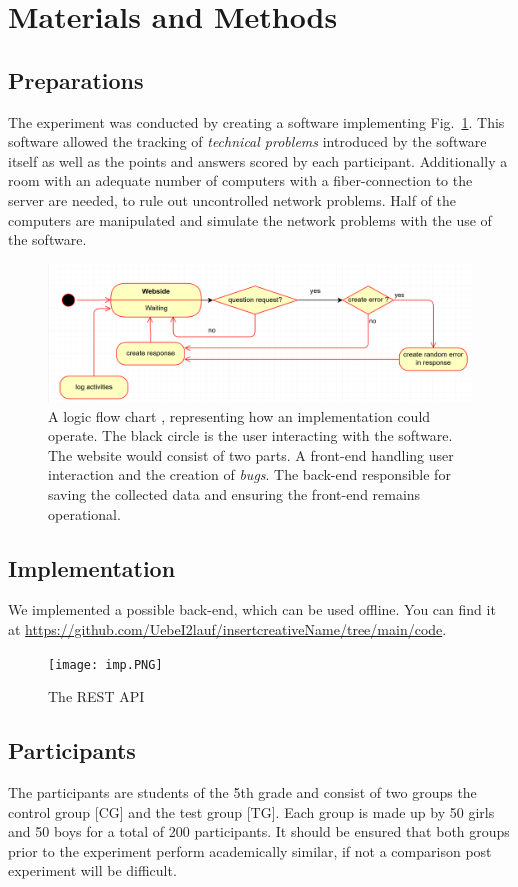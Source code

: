 \documentclass[12pt, a4paper]{article}
\begin{document}
\section{Materials and Methods}
\subsection*{Preparations}
The experiment was conducted by creating a software implementing Fig.~\ref{fig1}.
This software allowed the tracking of {\itshape technical problems} introduced by
the software itself as well as the points and answers scored by each participant.
Additionally a room with an adequate number of computers with a fiber-connection
to the server are needed, to rule out uncontrolled network problems.
Half of the computers are manipulated and simulate the network problems with the
use of the software.

\begin{figure}[h]
    \includegraphics[width=\textwidth]{UML Prototyp.PNG}
    \caption{A logic flow chart , representing how an implementation could operate.
    The black circle is the user interacting with the software. The website would
    consist of two parts. A front-end handling user interaction and the creation of {\itshape bugs}.
    The back-end responsible for saving the collected data and ensuring the front-end
    remains operational.} \label{fig1}
\end{figure}
\newpage
\subsection*{Implementation}
We implemented a possible back-end, which can be used offline. You can find it 
at \url{https://github.com/UebeI2lauf/insertcreativeName/tree/main/code}.
\begin{figure}[h]
    \texttt{[image: imp.PNG]}
    \caption{The REST API}
\end{figure}
\subsection*{Participants}
The participants are students of the 5th grade and consist of two groups the control group [CG] and
the test group [TG]. Each group is made up by 50 girls and 50 boys for a total of 200 participants.
It should be ensured that both groups prior to the experiment perform academically similar, if not a
comparison post experiment will be difficult.
\newpage
\end{document}
